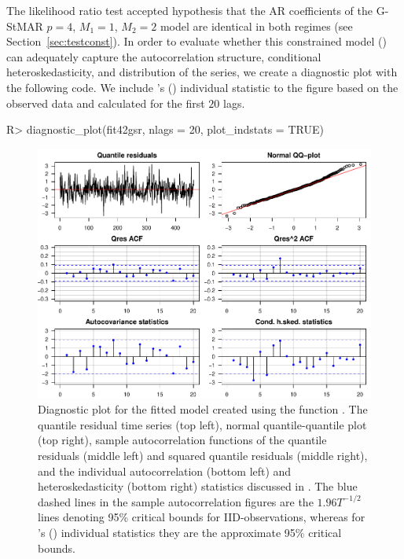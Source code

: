 \documentclass[nojss]{jss} %
\begin{document}
The likelihood ratio test accepted hypothesis that the AR coefficients of the G-StMAR $p=4$, $M_1=1$, $M_2=2$ model are identical in both regimes (see Section~\ref{sec:testconst}). In order to evaluate whether this constrained model () can adequately capture the autocorrelation structure, conditional heteroskedasticity, and distribution of the series, we create a diagnostic plot with the following code. We include \citeauthor{Kalliovirta:2012}'s (\citeyear{Kalliovirta:2012}) individual statistic to the figure based on the observed data and calculated for the first $20$ lags.
%
\begin{CodeChunk}
\begin{CodeInput}
R> diagnostic_plot(fit42gsr, nlags = 20, plot_indstats = TRUE)
\end{CodeInput}
\end{CodeChunk}
%

\begin{figure}[t]
  \centering
  \includegraphics{figures/diagplotfit42gsr.pdf}
  \caption{Diagnostic plot for the fitted model  created using the function . The quantile residual time series (top left), normal  quantile-quantile plot (top right), sample autocorrelation functions of the quantile residuals (middle left) and squared quantile residuals (middle right), and the individual autocorrelation (bottom left) and heteroskedasticity (bottom right) statistics discussed in \citet[pp. 369-370]{Kalliovirta:2012}. The blue dashed lines in the sample autocorrelation figures are the $1.96T^{-1/2}$ lines denoting 95\% critical bounds for IID-observations, whereas for \citeauthor{Kalliovirta:2012}'s (\citeyear{Kalliovirta:2012}) individual statistics they are the approximate 95\% critical bounds.}
\label{fig:diagplotfit42gs}
\end{figure}
\end{document}
